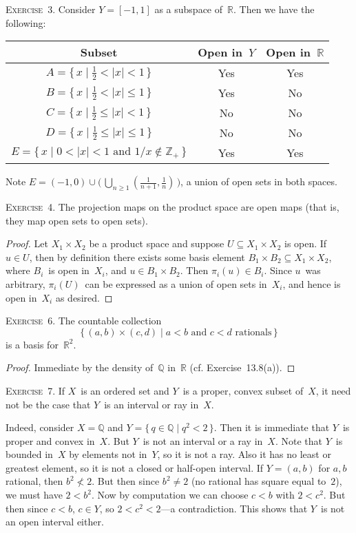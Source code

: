 \documentclass[letterpaper]{article}
\newcommand{\exercise}[1]{\goodbreak\noindent\textsc{Exercise~{#1}.}}
\newcommand{\Z}{\mathbb{Z}}
\newcommand{\Q}{\mathbb{Q}}
\newcommand{\R}{\mathbb{R}}
\newcommand{\union}{\cup}
\newcommand{\bigunion}{\bigcup}
\newcommand{\abs}[1]{|{#1}|}
\begin{document}
\exercise{3}
Consider $Y=[-1,1]$ as a subspace of~$\R$. Then we have the following:
\begin{center}
\begin{tabular}{c|c|c}
Subset&Open in~$Y$&Open in~$\R$\\
\hline
$A=\{\,x\mid\tfrac{1}{2}<\abs{x}<1\,\}$&Yes&Yes\\
$B=\{\,x\mid\tfrac{1}{2}<\abs{x}\le1\,\}$&Yes&No\\
$C=\{\,x\mid\tfrac{1}{2}\le\abs{x}<1\,\}$&No&No\\
$D=\{\,x\mid\tfrac{1}{2}\le\abs{x}\le1\,\}$&No&No\\
$E=\{\,x\mid 0<\abs{x}<1\text{ and }1/x\not\in\Z_+\,\}$&Yes&Yes
\end{tabular}
\end{center}
Note $E=(-1,0)\union\bigl(\,\bigunion_{n\ge1}(\tfrac{1}{n+1},\tfrac{1}{n})\,\bigr)$, a union of open sets in both spaces.

\bigskip
\exercise{4}
The projection maps on the product space are open maps (that is, they map open sets to open sets).
\begin{proof}
Let $X_1\times X_2$ be a product space and suppose $U\subseteq X_1\times X_2$ is open. If $u\in U$, then by definition there exists some basis element $B_1\times B_2\subseteq X_1\times X_2$, where $B_i$~is open in~$X_i$, and $u\in B_1\times B_2$. Then $\pi_i(u)\in B_i$. Since $u$~was arbitrary, $\pi_i(U)$~can be expressed as a union of open sets in~$X_i$, and hence is open in~$X_i$ as desired.
\end{proof}

\exercise{6}
The countable collection
$$\{\,(a,b)\times(c,d)\mid a<b\text{ and }c<d\text{ rationals}\,\}$$
is a basis for~$\R^2$.
\begin{proof}
Immediate by the density of~$\Q$ in~$\R$ (cf. Exercise~13.8(a)).
\end{proof}

\exercise{7}
If $X$~is an ordered set and $Y$~is a proper, convex subset of~$X$, it need not be the case that $Y$~is an interval or ray in~$X$.

Indeed, consider $X=\Q$ and $Y=\{\,q\in\Q\mid q^2<2\,\}$. Then it is immediate that $Y$~is proper and convex in~$X$. But $Y$~is not an interval or a ray in~$X$. Note that $Y$~is bounded in~$X$ by elements not in~$Y$, so it is not a ray. Also it has no least or greatest element, so it is not a closed or half-open interval. If $Y=(a,b)$ for $a,b$ rational, then $b^2\not<2$. But then since $b^2\ne 2$ (no rational has square equal to~$2$), we must have $2<b^2$. Now by computation we can choose $c<b$ with $2<c^2$. But then since $c<b$, $c\in Y$, so $2<c^2<2$---a contradiction. This shows that $Y$~is not an open interval either.
\end{document}
